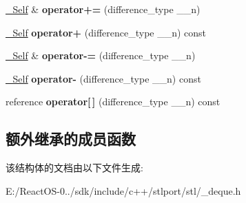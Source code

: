 \begin{DoxyCompactItemize}
\item 
\mbox{\label{struct___deque__iterator_ac38506a76cecbc51b7ceff4c7afb2669}} 
\hyperlink{struct___deque__iterator__base}{\+\_\+\+Self} \& {\bfseries operator+=} (difference\+\_\+type \+\_\+\+\_\+n)
\item 
\mbox{\label{struct___deque__iterator_a311e46c07da745438fc99cebbbe434fc}} 
\hyperlink{struct___deque__iterator__base}{\+\_\+\+Self} {\bfseries operator+} (difference\+\_\+type \+\_\+\+\_\+n) const
\item 
\mbox{\label{struct___deque__iterator_ac0aa998557341b60558d70923e965190}} 
\hyperlink{struct___deque__iterator__base}{\+\_\+\+Self} \& {\bfseries operator-\/=} (difference\+\_\+type \+\_\+\+\_\+n)
\item 
\mbox{\label{struct___deque__iterator_a373611306cb017b774df4c7f0733bea1}} 
\hyperlink{struct___deque__iterator__base}{\+\_\+\+Self} {\bfseries operator-\/} (difference\+\_\+type \+\_\+\+\_\+n) const
\item 
\mbox{\label{struct___deque__iterator_adc166c9146c5882bf76a83bb205b0b02}} 
reference {\bfseries operator\mbox{[}$\,$\mbox{]}} (difference\+\_\+type \+\_\+\+\_\+n) const
\end{DoxyCompactItemize}
\subsection*{额外继承的成员函数}


该结构体的文档由以下文件生成\+:\begin{DoxyCompactItemize}
\item 
E\+:/\+React\+O\+S-\/0../sdk/include/c++/stlport/stl/\+\_\+deque.\+h\end{DoxyCompactItemize}
